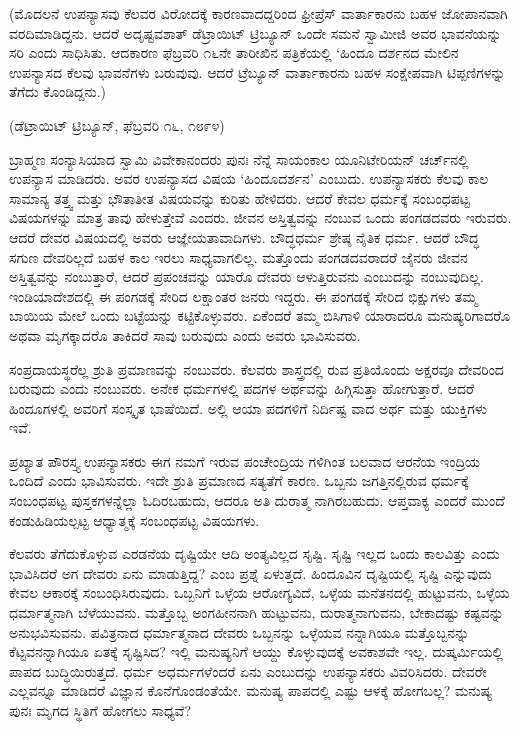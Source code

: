 \begin{center}
(ಮೊದಲನೆ ಉಪನ್ಯಾಸವು ಕೆಲವರ ವಿರೋದಕ್ಕೆ ಕಾರಣವಾದದ್ದರಿಂದ ಫ್ರೀಪ್ರೆಸ್​ ವಾರ್ತಾಕಾರನು ಬಹಳ ಜೋಪಾನವಾಗಿ ವರದಿಮಾಡಿದ್ದನು. ಆದರೆ ಅದೃಷ್ಟವಶಾತ್​ ಡೆಟ್ರಾಯಿಟ್​ ಟ್ರಿಬ್ಯೂನ್​ ಒಂದೇ ಸಮನೆ ಸ್ವಾಮೀಜಿ ಅವರ ಭಾವನೆಯನ್ನು ಸರಿ ಎಂದು ಸಾಧಿಸಿತು. ಆದಕಾರಣ ಫೆಬ್ರವರಿ ೧೬ನೇ ತಾರೀಖಿನ ಪತ್ರಿಕೆಯಲ್ಲಿ ‘ಹಿಂದೂ ದರ್ಶನದ ಮೇಲಿನ ಉಪನ್ಯಾಸದ ಕೆಲವು ಭಾವನೆಗಳು ಬರುವುವು. ಆದರೆ ಟ್ರೆಬ್ಯೂನ್​ ವಾರ್ತಾಕಾರನು ಬಹಳ ಸಂಕ್ಷೇಪವಾಗಿ ಟಿಪ್ಪಣಿಗಳನ್ನು ತೆಗೆದು ಕೊಂಡಿದ್ದನು.)
\end{center}

\begin{center}
(ಡೆಟ್ರಾಯಿಟ್​ ಟ್ರಿಬ್ಯೂನ್​, ಫೆಬ್ರವರಿ ೧೬, ೧೮೯೪)
\end{center}

ಬ್ರಾಹ್ಮಣ ಸಂನ್ಯಾಸಿಯಾದ ಸ್ವಾಮಿ ವಿವೇಕಾನಂದರು ಪುನಃ ನೆನ್ನೆ ಸಾಯಂಕಾಲ ಯೂನಿಟೇರಿಯನ್​ ಚರ್ಚ್​ನಲ್ಲಿ ಉಪನ್ಯಾಸ ಮಾಡಿದರು. ಅವರ ಉಪನ್ಯಾಸದ ವಿಷಯ ‘ಹಿಂದೂದರ್ಶನ’ ಎಂಬುದು. ಉಪನ್ಯಾಸಕರು ಕೆಲವು ಕಾಲ ಸಾಮಾನ್ಯ ತತ್ತ್ವ ಮತ್ತು ಭೌತಾತೀತ ವಿಷಯವನ್ನು ಕುರಿತು ಹೇಳಿದರು. ಆದರೆ ಕೇವಲ ಧರ್ಮಕ್ಕೆ ಸಂಬಂಧಪಟ್ಟ ವಿಷಯಗಳನ್ನು ಮಾತ್ರ ತಾವು ಹೇಳುತ್ತೇವೆ ಎಂದರು. ಜೀವನ ಅಸ್ತಿತ್ವವನ್ನು ನಂಬುವ ಒಂದು ಪಂಗಡದವರು ಇರುವರು. ಆದರೆ ದೇವರ ವಿಷಯದಲ್ಲಿ ಅವರು ಆಜ್ಞೇಯತಾವಾದಿಗಳು. ಬೌದ್ಧಧರ್ಮ ಶ್ರೇಷ್ಠ ನೈತಿಕ ಧರ್ಮ. ಆದರೆ ಬೌದ್ಧ ಸಗುಣ ದೇವರಿಲ್ಲದೆ ಬಹಳ ಕಾಲ ಇರಲು ಸಾಧ್ಯವಾಗಲಿಲ್ಲ. ಮತ್ತೊಂದು ಪಂಗಡದವರಾದರೆ ಜೈನರು ಜೀವನ ಅಸ್ತಿತ್ವವನ್ನು ನಂಬುತ್ತಾರೆ, ಆದರೆ ಪ್ರಪಂಚವನ್ನು ಯಾರೊ ದೇವರು ಆಳುತ್ತಿರುವನು ಎಂಬುದನ್ನು ನಂಬುವುದಿಲ್ಲ. ಇಂಡಿಯಾದೇಶದಲ್ಲಿ ಈ ಪಂಗಡಕ್ಕೆ ಸೇರಿದ ಲಕ್ಷಾಂತರ ಜನರು ಇದ್ದರು. ಈ ಪಂಗಡಕ್ಕೆ ಸೇರಿದ ಭಿಕ್ಷುಗಳು ತಮ್ಮ ಬಾಯಿಯ ಮೇಲೆ ಒಂದು ಬಟ್ಟೆಯನ್ನು ಕಟ್ಟಿಕೊಳ್ಳುವರು. ಏಕೆಂದರೆ ತಮ್ಮ ಬಿಸಿಗಾಳಿ ಯಾರಾದರೂ ಮನುಷ್ಯರಿಗಾದರೊ ಅಥವಾ ಮೃಗಕ್ಕಾದರೊ ತಾಕಿದರೆ ಸಾವು ಬರುವುದು ಎಂದು ಅವರು ಭಾವಿಸುವರು.

ಸಂಪ್ರದಾಯಸ್ಥರೆಲ್ಲ ಶ್ರುತಿ ಪ್ರಮಾಣವನ್ನು ನಂಬುವರು. ಕೆಲವರು ಶಾಸ್ತ್ರದಲ್ಲಿ ರುವ ಪ್ರತಿಯೊಂದು ಅಕ್ಷರವೂ ದೇವರಿಂದ ಬರುವುದು ಎಂದು ನಂಬುವರು. ಅನೇಕ ಧರ್ಮಗಳಲ್ಲಿ ಪದಗಳ ಅರ್ಥವನ್ನು ಹಿಗ್ಗಿಸುತ್ತಾ ಹೋಗುತ್ತಾರೆ. ಆದರೆ ಹಿಂದೂಗಳಲ್ಲಿ ಅವರಿಗೆ ಸಂಸ್ಕೃತ ಭಾಷೆಯಿದೆ. ಅಲ್ಲಿ ಆಯಾ ಪದಗಳಿಗೆ ನಿರ್ದಿಷ್ಟ ವಾದ ಅರ್ಥ ಮತ್ತು ಯುಕ್ತಿಗಳು ಇವೆ.

ಪ್ರಖ್ಯಾತ ಪೌರಸ್ತ್ಯ ಉಪನ್ಯಾಸಕರು ಈಗ ನಮಗೆ ಇರುವ ಪಂಚೇಂದ್ರಿಯ ಗಳಿಗಿಂತ ಬಲವಾದ ಆರನೆಯ ಇಂದ್ರಿಯ ಒಂದಿದೆ ಎಂದು ಭಾವಿಸುವರು. ಇದೇ ಶ್ರುತಿ ಪ್ರಮಾಣದ ಸತ್ಯತೆಗೆ ಕಾರಣ. ಒಬ್ಬನು ಜಗತ್ತಿನಲ್ಲಿರುವ ಧರ್ಮಕ್ಕೆ ಸಂಬಂಧಪಟ್ಟ ಪುಸ್ತಕಗಳನ್ನೆಲ್ಲಾ ಓದಿರಬಹುದು, ಆದರೂ ಅತಿ ದುರಾತ್ಮ ನಾಗಿರಬಹುದು. ಆಪ್ತವಾಕ್ಯ ಎಂದರೆ ಮುಂದೆ ಕಂಡುಹಿಡಿಯಲ್ಪಟ್ಟ ಆಧ್ಯಾತ್ಮಕ್ಕೆ ಸಂಬಂಧಪಟ್ಟ ವಿಷಯಗಳು.

ಕೆಲವರು ತೆಗೆದುಕೊಳ್ಳುವ ಎರಡನೆಯ ದೃಷ್ಟಿಯೇ ಆದಿ ಅಂತ್ಯವಿಲ್ಲದ ಸೃಷ್ಟಿ. ಸೃಷ್ಟಿ ಇಲ್ಲದ ಒಂದು ಕಾಲವಿತ್ತು ಎಂದು ಭಾವಿಸಿದರೆ ಅಗ ದೇವರು ಏನು ಮಾಡುತ್ತಿದ್ದ? ಎಂಬ ಪ್ರಶ್ನೆ ಏಳುತ್ತದೆ. ಹಿಂದೂವಿನ ದೃಷ್ಟಿಯಲ್ಲಿ ಸೃಷ್ಟಿ ಎನ್ನುವುದು ಕೇವಲ ಆಕಾರಕ್ಕೆ ಸಂಬಂಧಿಸಿರುವುದು. ಒಬ್ಬನಿಗೆ ಒಳ್ಳೆಯ ಆರೋಗ್ಯವಿದೆ, ಒಳ್ಳೆಯ ಮನೆತನದಲ್ಲಿ ಹುಟ್ಟುವನು, ಒಳ್ಳೆಯ ಧರ್ಮಾತ್ಮನಾಗಿ ಬೆಳೆಯುವನು. ಮತ್ತೊಬ್ಬ ಅಂಗಹೀನನಾಗಿ ಹುಟ್ಟುವನು, ದುರಾತ್ಮನಾಗುವನು, ಬೇಕಾದಷ್ಟು ಕಷ್ಟವನ್ನು ಅನುಭವಿಸುವನು. ಪವಿತ್ರನಾದ ಧರ್ಮಾತ್ಮನಾದ ದೇವರು ಒಬ್ಬನನ್ನು ಒಳ್ಳೆಯವ ನನ್ನಾಗಿಯೂ ಮತ್ತೊಬ್ಬನನ್ನು ಕೆಟ್ಟವನನ್ನಾಗಿಯೂ ಏತಕ್ಕೆ ಸೃಷ್ಟಿಸಿದ? ಇಲ್ಲಿ ಮನುಷ್ಯನಿಗೆ ಆಯ್ದು ಕೊಳ್ಳುವುದಕ್ಕೆ ಅವಕಾಶವೇ ಇಲ್ಲ. ದುಷ್ಕರ್ಮಿಯಲ್ಲಿ ಪಾಪದ ಬುದ್ಧಿಯಿರುತ್ತದೆ. ಧರ್ಮ ಅಧರ್ಮಗಳೆಂದರೆ ಏನು ಎಂಬುದನ್ನು ಉಪನ್ಯಾಸಕರು ವಿವರಿಸಿದರು. ದೇವರೇ ಎಲ್ಲವನ್ನೂ ಮಾಡಿದರೆ ವಿಜ್ಞಾನ ಕೊನೆಗೊಂಡಂತೆಯೇ. ಮನುಷ್ಯ ಪಾಪದಲ್ಲಿ ಎಷ್ಟು ಆಳಕ್ಕೆ ಹೋಗಬಲ್ಲ? ಮನುಷ್ಯ ಪುನಃ ಮೃಗದ ಸ್ಥಿತಿಗೆ ಹೋಗಲು ಸಾಧ್ಯವೆ?

